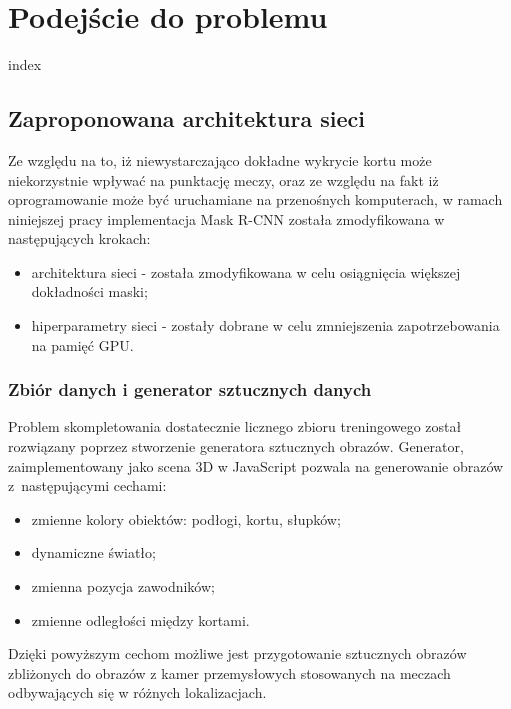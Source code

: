 \chapter{Podejście do problemu}

{index}

\newpage
\section{Zaproponowana architektura sieci}
\label{sec:zaproponowana_architektura}

Ze względu na to, iż niewystarczająco dokładne wykrycie kortu może niekorzystnie wpływać na punktację meczy, oraz ze względu na fakt iż oprogramowanie może być uruchamiane na przenośnych komputerach, w ramach niniejszej pracy implementacja Mask R-CNN została zmodyfikowana w następujących krokach:

\begin{itemize}
	\item architektura sieci - została zmodyfikowana w celu osiągnięcia większej dokładności maski;
	\item hiperparametry sieci - zostały dobrane w celu zmniejszenia zapotrzebowania na pamięć GPU.
\end{itemize}


\subsection{Zbiór danych i generator sztucznych danych}
\label{sec:generator}

Problem skompletowania dostatecznie licznego zbioru treningowego został rozwiązany poprzez stworzenie generatora sztucznych obrazów.
Generator, zaimplementowany jako scena 3D w JavaScript pozwala na generowanie obrazów z~następującymi cechami:

\begin{itemize}
	\item zmienne kolory obiektów: podłogi, kortu, słupków;
	\item dynamiczne światło;
	\item zmienna pozycja zawodników;
	\item zmienne odległości między kortami.
\end{itemize}

Dzięki powyższym cechom możliwe jest przygotowanie sztucznych obrazów zbliżonych do obrazów z kamer przemysłowych stosowanych na meczach odbywających się w różnych lokalizacjach.

